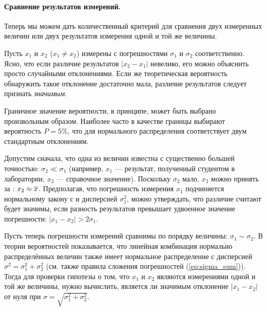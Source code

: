 \paragraph{Сравнение результатов измерений.}
Теперь мы можем дать количественный критерий для сравнения двух измеренных
величин или двух результатов измерения одной и той же величины.

Пусть $x_{1}$ и $x_{2}$ ($x_{1}\ne x_{2}$) измерены с
погрешностями $\sigma_{1}$ и $\sigma_{2}$ соответственно.
Ясно, что если различие результатов $|x_2-x_1|$ невелико,
его можно объяснить просто случайными отклонениями.
Если же теоретическая вероятность обнаружить такое отклонение
достаточно мала, различие результатов следует признать \emph{значимым}.

Граничное значение вероятности, в принципе, может быть выбрано произвольным
образом. Наиболее часто в качестве границы выбирают вероятность $P=5\%$,
что для нормального распределения соответствует двум стандартным отклонениям.

Допустим сначала, что одна из величин известна с существенно большей точностью:
$\sigma_{2}\ll\sigma_{1}$ (например, $x_{1}$ --- результат, полученный
студентом в лаборатории, $x_{2}$ --- справочное значение).
Поскольку $\sigma_{2}$ мало, $x_{2}$ можно принять за :
$x_{2}\approx \overline{x}$. Предполагая, что погрешность измерения
$x_{1}$ подчиняется нормальному закону с и дисперсией $\sigma_{1}^{2}$,
можно утверждать, что
различие считают будет значимы, если разность результатов превышает
удвоенное значение погрешности: $\left|x_{1}-x_{2}\right|>2\sigma_{1}$.

Пусть теперь погрешности измерений сравнимы по порядку величины:
$\sigma_{1}\sim\sigma_{2}$. В теории вероятностей показывается, что
линейная комбинация нормально распределённых величин также имеет нормальное
распределение с дисперсией $\sigma^{2}=\sigma_{1}^{2}+\sigma_{2}^{2}$
(см. также правила сложения погрешностей (\ref{eq:sigma_sum})). Тогда
для проверки гипотезы о том, что $x_{1}$ и $x_{2}$ являются измерениями
одной и той же величины, нужно вычислить, является ли значимым отклонение
$\left|x_{1}-x_{2}\right|$ от нуля при $\sigma=\sqrt{\sigma_{1}^{2}+\sigma_{2}^{2}}$.



